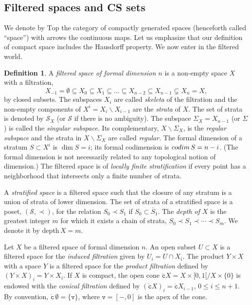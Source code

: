 \documentclass[a4paper,10pt,english,reqno]{amsart}
\theoremstyle{plain}
\theoremstyle{definition}
\newtheorem{definition}[proposition]{Definition}
\theoremstyle{remark}
\numberwithin{equation}{section}
\def\ov{\overline}
\def\cS{{\mathcal S}}
\def\tc{{\mathtt c}}
\def\tv{{\mathtt v}}
\def\codim{{\rm codim\,}}
\def\rc{{\mathring{\tc}}}
\def\menos{\backslash}
\def\depth{{\mathrm{depth \,}}}
\def\top{{\mathbf{Top}}}
\def\top{{\mathrm{Top}}}
\renewcommand\1{\hbox{\ding{192}}}
\renewcommand\2{\hbox{\ding{193}}}
\newcommand\3{\hbox{\ding{194}}}
\newcommand\4{\hbox{\ding{195}}}
\begin{document}
\subsection{Filtered spaces and CS sets}\label{sec:pseudo}
 We denote by $\top$ the category of compactly generated spaces (henceforth called ``space'') 
 with arrows the continuous maps.
%
Let us  emphasize that our definition of compact space includes the Hausdorff property. We now enter in the filtered world.

\begin{definition}\label{def:filteredspace}
A \emph{filtered space of formal dimension $n$} is a non-empty space $X$ 
with a filtration,
$$
X_{-1}=\emptyset\subseteq X_{0} \subseteq X_{1}\subseteq \dots \subseteq X_{n-2} \subseteq X_{n-1} \subsetneq X_{n} =X,
$$
by closed subsets. 
The subspaces $X_{i}$ are called \emph{skeleta} of the filtration and the 
non-empty components of $X^{i}=X_{i}\menos X_{i-1}$ are the \emph{strata}  of $X$. 
The set of strata is denoted by $\cS_{X}$ (or $\cS$ if there is no ambiguity).
The subspace $\Sigma_{X}=X_{n-1}$ (or $\Sigma$)  is called the \emph{singular subspace.}
Its complementary, $X\menos \Sigma_{X}$, is the \emph{regular subspace} and the
strata in $X\menos \Sigma_{X}$ are called \emph{regular.} 
The formal dimension of a stratum $S\subset X^{i}$ is $\dim S=i$; its formal codimension is
$\codim S=n-i$.
%
%
(The formal dimension is not necessarily related to  any topological notion of dimension.)
%
%
The filtered space is of \emph{locally finite stratification} if every point has a neighborhood that intersects only a finite number of strata.

A \emph{stratified space} is a filtered space such that the closure of any stratum is a union of strata of lower dimension.
The set of strata of a stratified space is a poset, $(\cS,\prec)$, for the relation
$S_{0}\prec S_{1}$ if $S_{0}\subset \ov{S}_{1}$.
%
The \emph{depth of $X$}    is the greatest integer $m$ for which it exists a chain of strata,
 $S_{0}\prec S_{1}\prec \cdots\prec S_{m} $.
 We denote it by $\depth X=m$.
\end{definition}

Let $X$ be a filtered space of formal dimension $n$.
An open subset $U \subset X$ is a filtered space for the \emph{induced filtration} given by
$U_i = U \cap X_{i}$.
The product $Y\times X$ with  a  space $Y$  is a filtered space for the \emph{product filtration} defined by
$\left(Y \times X\right) _i = Y \times X_{i}$. 
 If $X$ is compact, the open cone 
$\rc X = X \times [0,1[ \big/ X \times \{ 0 \}$ is endowed with the 
\emph{conical filtration} defined by
$\left(\rc X\right) _i =\rc X_{i-1}$,  $0\leq i\leq n+1$. 
By convention, 
$\rc \,\emptyset=\{ \tv \}$, where $\tv=[-,0]$ is the apex of the cone.
\end{document}
